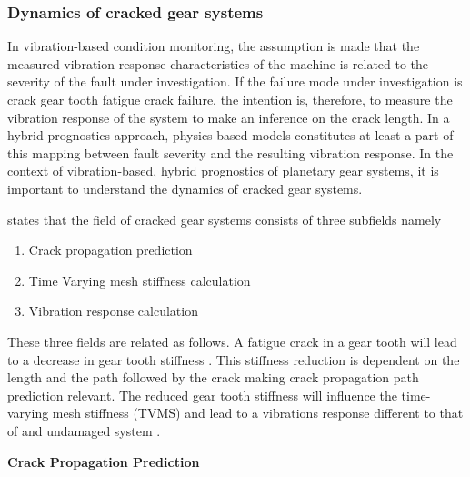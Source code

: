 \subsubsection{Dynamics of cracked gear systems}
In vibration-based condition monitoring, the assumption is made that the measured vibration response characteristics of the machine is related to the severity of the fault under investigation. If the failure mode under investigation is crack gear tooth fatigue crack failure, the intention is, therefore, to measure the vibration response of the system to make an inference on the crack length. In a hybrid prognostics approach, physics-based models constitutes at least a part of this mapping between fault severity and the resulting vibration response. In the context of vibration-based, hybrid prognostics of planetary gear systems, it is important to understand the dynamics of cracked gear systems. 

\cite{Ma2015} states that the field of cracked gear systems consists of three subfields namely 

\begin{enumerate}
	\item Crack propagation prediction
	\item Time Varying mesh stiffness calculation
	\item Vibration response calculation
\end{enumerate}

These three fields are related as follows. A fatigue crack in a gear tooth will lead to a decrease in gear tooth stiffness \citep{Chaari2008}. This stiffness reduction is dependent on the length and the path followed by the crack making crack propagation path prediction relevant. The reduced gear tooth stiffness will influence the time-varying mesh stiffness (TVMS) and lead to a vibrations response different to that of and undamaged system \cite{Belsak2007,Ma2015}.


\textbf{Crack Propagation Prediction}

